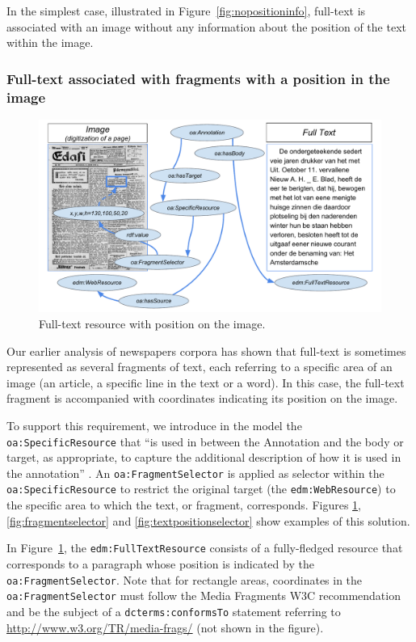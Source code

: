 \documentclass[a4paper,UKenglish,cleveref, autoref]{oasics-v2019}
\begin{document}
In the simplest case, illustrated in Figure~\ref{fig:nopositioninfo}, full-text is associated with an image without any information about the position of the text within the image.

\subsubsection{Full-text associated with fragments with a position in the image}

\begin{figure}
    \centering
    \includegraphics{Fig3}
    \caption{Full-text resource with position on the image.}\label{fig:withposition}
\end{figure}

Our earlier analysis of newspapers corpora \cite{Charles16} has shown that full-text is sometimes represented as several fragments of text, each referring to a specific area of an image (an article, a specific line in the text or a word). In this case, the full-text fragment is accompanied with coordinates indicating its position on the image. 

To support this requirement, we introduce in the model the \verb+oa:SpecificResource+ that ``is used in between the Annotation and the body or target, as appropriate, to capture the additional description of how it is used in the annotation'' \cite{Goosen17}. An \verb+oa:FragmentSelector+ is applied as selector within the \verb+oa:SpecificResource+ to restrict the original target (the \verb+edm:WebResource+) to the specific area to which the text, or fragment, corresponds. Figures \ref{fig:withposition}, \ref{fig:fragmentselector} and \ref{fig:textpositionselector} show examples of this solution.

In Figure~\ref{fig:withposition}, the \verb+edm:FullTextResource+ consists of a fully-fledged resource that corresponds to a paragraph whose position is indicated by the \verb+oa:FragmentSelector+. Note that for rectangle areas, coordinates in the \verb+oa:FragmentSelector+ must follow the Media Fragments W3C recommendation and be the subject of a \verb+dcterms:conformsTo+ statement referring to \url{http://www.w3.org/TR/media-frags/} (not shown in the figure).
\end{document}
